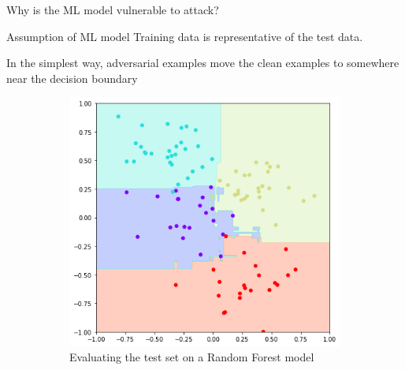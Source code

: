 \documentclass[9pt]{beamer}
\begin{document}
\begin{frame}{Why is the ML model vulnerable to attack?}
\label{decision_boundary}

\begin{block}{Assumption of ML model}
Training data is representative of the test data.
\end{block}

In the simplest way, adversarial examples move the clean examples to somewhere near the decision boundary

\begin{figure}
    \centering
    \small
    \begin{subfigure}[t]{0.38\linewidth}
        \centering
        \includegraphics[width=\linewidth]{images/dt_test_set.png}
        \caption{Evaluating the test set on a Random Forest model}
    \end{subfigure}
    \hspace{2em}
    \begin{subfigure}[t]{0.38\linewidth}
        \centering

\end{subfigure}
\end{figure}
\end{frame}
\end{document}

